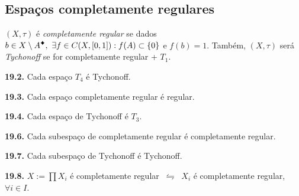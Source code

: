 
\subsection*{Espaços completamente regulares}

\begin{definition}
    \((X, \tau)\) é \emph{completamente regular} se dados \(b \in X\setminus A\ce, \ \exists f\in C(X,[0,1]) : f(A) \subset \{0\} \) e \(f(b) = 1\). Também, \((X,\tau)\) será \emph{Tychonoff} se for completamente regular + \(T_1\). 
\end{definition}

\begin{proposition}
    \textbf{19.2.} Cada espaço \(T_4\) é Tychonoff. 
\end{proposition}

\begin{proposition}
    \textbf{19.3.} Cada espaço completamente regular é regular. 
\end{proposition}

\begin{corollary}
    \textbf{19.4.} Cada espaço de Tychonoff é \(T_3\). 
\end{corollary}

\hypertarget{prop196}{}
\begin{proposition}
    \textbf{19.6.} Cada subespaço de completamente regular é completamente regular. 
\end{proposition}

\begin{corollary}
    \textbf{19.7.} Cada subespaço de Tychonoff é Tychonoff. 
\end{corollary}

\begin{proposition}
    \textbf{19.8.} \(X := \prod X_i\) é completamente regular \(\ \leftrightharpoons \ \) \(X_i\) é completamente regular, \(\forall i \in I\).
\end{proposition}

